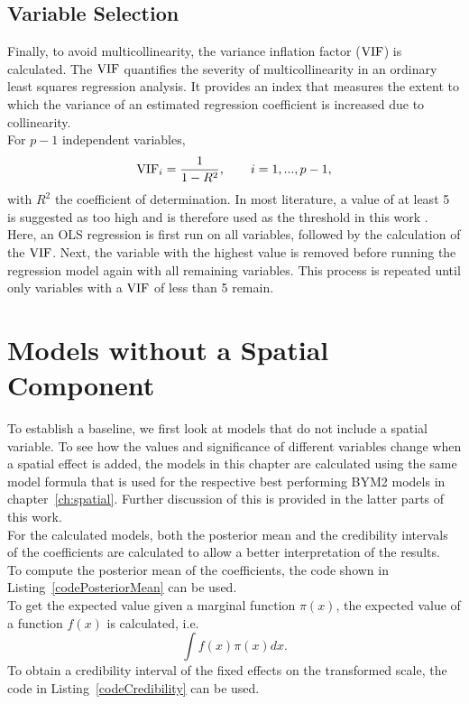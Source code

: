 \subsection{Variable Selection}
Finally, to avoid multicollinearity, the variance inflation factor ($\hbox{VIF}$) is calculated.  The $\hbox{VIF}$ quantifies the severity of multicollinearity in an ordinary least squares regression analysis. It provides an index that measures the extent to which the variance of an estimated regression coefficient is increased due to collinearity. \\
For $p-1$ independent variables, 
\begin{equation}
    \hbox{VIF}_i = \frac{1}{1-R^2},\hspace{20pt}i=1,...,p-1,
\end{equation}
with $R^2$ the coefficient of determination. In most literature, a value of at least 5 is suggested as too high and is therefore used as the threshold in this work \autocite[][]{craney2002model}. \\
Here, an OLS regression is first run on all variables, followed by the calculation of the $\hbox{VIF}$. Next, the variable with the highest value is removed before running the regression model again with all remaining variables. This process is repeated until only variables with a $\hbox{VIF}$ of less than 5 remain.
\clearpage
\section{Models without a Spatial Component}
To establish a baseline, we first look at models that do not include a spatial variable. To see how the values and significance of different variables change when a spatial effect is added, the models in this chapter are calculated using the same model formula that is used for the respective best performing BYM2 models in chapter~\ref{ch:spatial}. Further discussion of this is provided in the latter parts of this work. \\
For the calculated models, both the posterior mean and the credibility intervals of the coefficients are calculated to allow a better interpretation of the results. \\
To compute the posterior mean of the coefficients, the code shown in Listing~\ref{codePosteriorMean} can be used. \\
To get the expected value given a marginal function $\pi\left(x\right)$, the expected value of a function $f\left(x\right)$ is calculated, i.e.
\begin{equation*}
    \int f\left(x\right)\pi\left(x\right)dx.
\end{equation*}
To obtain a credibility interval of the fixed effects on the transformed scale, the code in Listing~\ref{codeCredibility} can be used. \\
